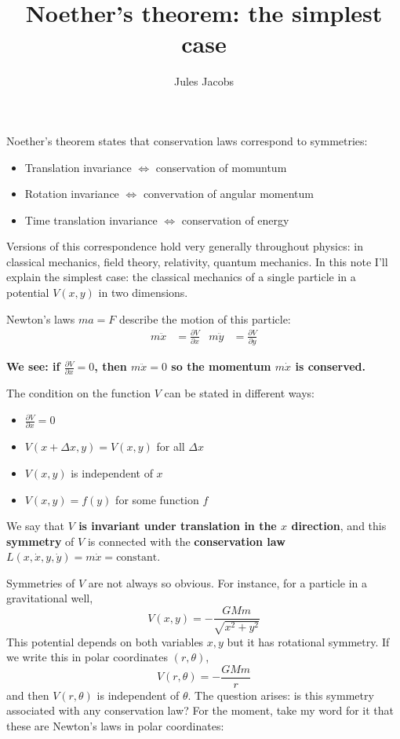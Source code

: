 \documentclass[a4paper, 11pt]{article}
\title{Noether's theorem: the simplest case}
\author{Jules Jacobs}
\theoremstyle{definition}
\begin{document}
\maketitle

Noether's theorem states that conservation laws correspond to symmetries:
\begin{itemize}
  \item Translation invariance $\iff$ conservation of momuntum
  \item Rotation invariance $\iff$ convervation of angular momentum
  \item Time translation invariance $\iff$ conservation of energy
\end{itemize}
Versions of this correspondence hold very generally throughout physics: in classical mechanics, field theory, relativity, quantum mechanics. In this note I'll explain the simplest case: the classical mechanics of a single particle in a potential $V(x,y)$ in two dimensions.
\medskip

Newton's laws $ma = F$ describe the motion of this particle:
\begin{align*}
  m \ddot x &= \frac{\partial V}{\partial x} &
  m \ddot y &= \frac{\partial V}{\partial y}
\end{align*}

\textbf{We see: if $\frac{\partial V}{\partial x} = 0$, then $m \ddot x = 0$ so the momentum $m \dot x$ is conserved.}

The condition on the function $V$ can be stated in different ways:
\begin{itemize}
  \item $\frac{\partial V}{\partial x} = 0$
  \item $V(x + \Delta x, y) = V(x,y)$ for all $\Delta x$
  \item $V(x,y)$ is independent of $x$
  \item $V(x,y) = f(y)$ for some function $f$
\end{itemize}

We say that \textbf{$V$ is invariant under translation in the $x$ direction}, and this \textbf{symmetry} of $V$ is connected with the \textbf{conservation law} $L(x,\dot x, y, \dot y) = m\dot x = \text{constant}$.

Symmetries of $V$ are not always so obvious. For instance, for a particle in a gravitational well,
\[
  V(x,y) = -\frac{G M m}{\sqrt{x^2 + y^2}}
\]
This potential depends on both variables $x,y$ but it has rotational symmetry. If we write this in polar coordinates $(r,\theta)$,
\[
  V(r,\theta) = -\frac{G M m}{r}
\]
and then $V(r,\theta)$ is independent of $\theta$. The question arises: is this symmetry associated with any conservation law? For the moment, take my word for it that these are Newton's laws in polar coordinates:
\end{document}

